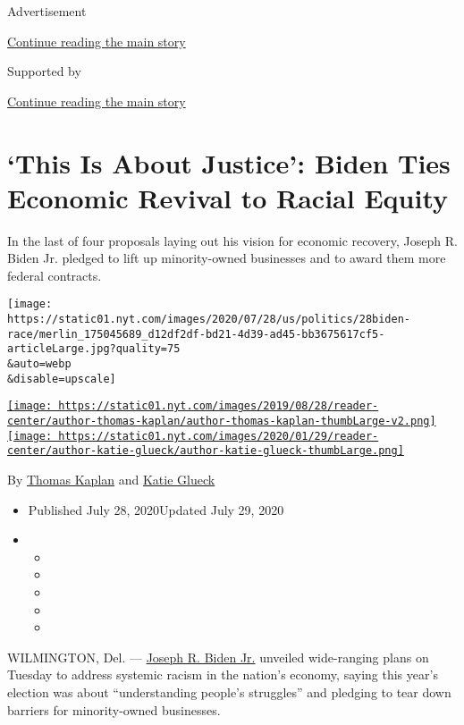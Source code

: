 Advertisement

\protect\hyperlink{after-top}{Continue reading the main story}

Supported by

\protect\hyperlink{after-sponsor}{Continue reading the main story}

\hypertarget{this-is-about-justice-biden-ties-economic-revival-to-racial-equity}{%
\section{`This Is About Justice': Biden Ties Economic Revival to Racial
Equity}\label{this-is-about-justice-biden-ties-economic-revival-to-racial-equity}}

In the last of four proposals laying out his vision for economic
recovery, Joseph R. Biden Jr. pledged to lift up minority-owned
businesses and to award them more federal contracts.

\texttt{[image: https://static01.nyt.com/images/2020/07/28/us/politics/28biden-race/merlin\_175045689\_d12df2df-bd21-4d39-ad45-bb3675617cf5-articleLarge.jpg?quality=75\\\&auto=webp\\\&disable=upscale]}

\href{https://www.nytimes.com/by/thomas-kaplan}{\texttt{[image: https://static01.nyt.com/images/2019/08/28/reader-center/author-thomas-kaplan/author-thomas-kaplan-thumbLarge-v2.png]}}\href{https://www.nytimes.com/by/katie-glueck}{\texttt{[image: https://static01.nyt.com/images/2020/01/29/reader-center/author-katie-glueck/author-katie-glueck-thumbLarge.png]}}

By \href{https://www.nytimes.com/by/thomas-kaplan}{Thomas Kaplan} and
\href{https://www.nytimes.com/by/katie-glueck}{Katie Glueck}

\begin{itemize}
\item
  Published July 28, 2020Updated July 29, 2020
\item
  \begin{itemize}
  \item
  \item
  \item
  \item
  \item
  \end{itemize}
\end{itemize}

WILMINGTON, Del. ---
\href{https://www.nytimes.com/interactive/2020/us/elections/joe-biden.html}{Joseph
R. Biden Jr.} unveiled wide-ranging plans on Tuesday to address systemic
racism in the nation's economy, saying this year's election was about
``understanding people's struggles'' and pledging to tear down barriers
for minority-owned businesses.

